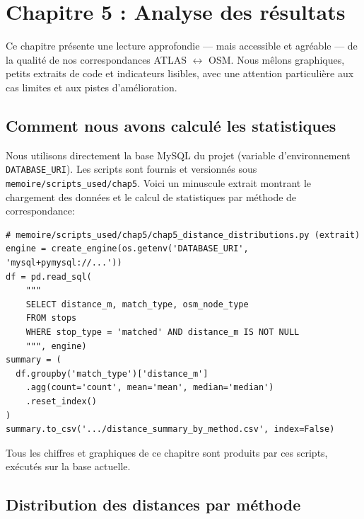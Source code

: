 \chapter{Chapitre 5 : Analyse des résultats}

Ce chapitre présente une lecture approfondie — mais accessible et agréable — de la qualité de nos correspondances ATLAS $\leftrightarrow$ OSM. Nous mêlons graphiques, petits extraits de code et indicateurs lisibles, avec une attention particulière aux cas limites et aux pistes d'amélioration.

\section{Comment nous avons calculé les statistiques}

Nous utilisons directement la base MySQL du projet (variable d'environnement \texttt{DATABASE\_URI}). Les scripts sont fournis et versionnés sous \texttt{memoire/scripts\_used/chap5}. Voici un minuscule extrait montrant le chargement des données et le calcul de statistiques par méthode de 
correspondance:

\begin{verbatim}
# memoire/scripts_used/chap5/chap5_distance_distributions.py (extrait)
engine = create_engine(os.getenv('DATABASE_URI', 'mysql+pymysql://...'))
df = pd.read_sql(
    """
    SELECT distance_m, match_type, osm_node_type
    FROM stops
    WHERE stop_type = 'matched' AND distance_m IS NOT NULL
    """, engine)
summary = (
  df.groupby('match_type')['distance_m']
    .agg(count='count', mean='mean', median='median')
    .reset_index()
)
summary.to_csv('.../distance_summary_by_method.csv', index=False)
\end{verbatim}

Tous les chiffres et graphiques de ce chapitre sont produits par ces scripts, exécutés sur la base actuelle.

\section{Distribution des distances par méthode}

